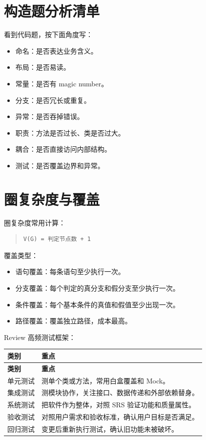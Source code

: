 \documentclass[UTF8,zihao=-4]{ctexart}
\begin{document}
\section{构造题分析清单}

看到代码题，按下面角度写：

\begin{itemize}
\item 命名：是否表达业务含义。
\item 布局：是否易读。
\item 常量：是否有 magic number。
\item 分支：是否冗长或重复。
\item 异常：是否吞掉错误。
\item 职责：方法是否过长、类是否过大。
\item 耦合：是否直接访问内部结构。
\item 测试：是否覆盖边界和异常。
\end{itemize}

\section{圈复杂度与覆盖}

圈复杂度常用计算：

\begin{quote}
\footnotesize
\begin{verbatim}
V(G) = 判定节点数 + 1
\end{verbatim}
\end{quote}

覆盖类型：

\begin{itemize}
\item 语句覆盖：每条语句至少执行一次。
\item 分支覆盖：每个判定的真分支和假分支至少执行一次。
\item 条件覆盖：每个基本条件的真值和假值至少出现一次。
\item 路径覆盖：覆盖独立路径，成本最高。
\end{itemize}

Review 高频测试框架：

{
\footnotesize
\begin{longtable}{|>{\raggedright\arraybackslash}p{}|>{\raggedright\arraybackslash}p{}|}
\hline
\textbf{类别} & \textbf{重点} \\
\hline
\endfirsthead
\hline
\textbf{类别} & \textbf{重点} \\
\hline
\endhead
单元测试 & 测单个类或方法，常用白盒覆盖和 Mock。 \\
\hline
集成测试 & 测模块协作，关注接口、数据传递和外部依赖替身。 \\
\hline
系统测试 & 把软件作为整体，对照 SRS 验证功能和质量属性。 \\
\hline
验收测试 & 对照用户需求和验收标准，确认用户目标是否满足。 \\
\hline
回归测试 & 变更后重新执行测试，确认旧功能未被破坏。 \\
\hline
\end{longtable}
}
\end{document}
